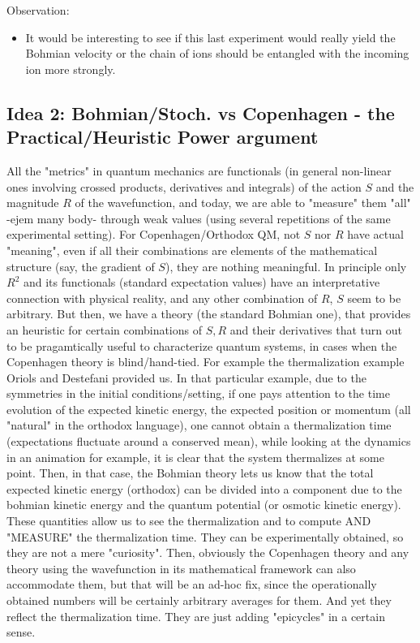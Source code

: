 \documentclass[11pt, a4paper]{article} %
\begin{document}
 Observation:
 \begin{itemize}
 \item It would be interesting to see if this last experiment would really yield the Bohmian velocity or the chain of ions should be entangled with the incoming ion more strongly.
 \end{itemize}
 \newpage

\subsection*{Idea 2: Bohmian/Stoch. vs Copenhagen - the Practical/Heuristic Power argument}
All the "metrics" in quantum mechanics are functionals (in general non-linear ones involving crossed products, derivatives and integrals) of the action $S$ and the magnitude $R$ of the wavefunction, and today, we are able to "measure" them "all" -ejem many body- through weak values (using several repetitions of the same experimental setting). For Copenhagen/Orthodox QM, not $S$ nor $R$ have actual "meaning", even if all their combinations are elements of the mathematical structure (say, the gradient of $S$), they are nothing meaningful. In principle only $R^2$ and its functionals (standard expectation values) have an interpretative connection with physical reality, and any other combination of $R$, $S$ seem to be arbitrary. But then, we have a theory (the standard Bohmian one), that provides an heuristic for certain combinations of $S,R$ and their derivatives that turn out to be pragamtically useful to characterize quantum systems, in cases when the Copenhagen theory is blind/hand-tied. For example the thermalization example Oriols and Destefani provided us. In that particular example, due to the symmetries in the initial conditions/setting, if one pays attention to the time evolution of the expected kinetic energy, the expected position or momentum (all "natural" in the orthodox language), one cannot obtain a thermalization time (expectations fluctuate around a conserved mean), while looking at the dynamics in an animation for example, it is clear that the system thermalizes at some point. Then, in that case, the Bohmian theory lets us know that the total expected kinetic energy (orthodox) can be divided into a component due to the bohmian kinetic energy and the quantum potential (or osmotic kinetic energy).  These quantities allow us to see the thermalization and to compute AND "MEASURE" the thermalization time. They can be experimentally obtained, so they are not a mere "curiosity". Then, obviously the Copenhagen theory and any theory using the wavefunction in its mathematical framework can also accommodate them, but that will be an ad-hoc fix, since the operationally obtained numbers will be certainly arbitrary averages for them. And yet they reflect the thermalization time. They are just adding "epicycles" in a certain sense. 
\end{document}
